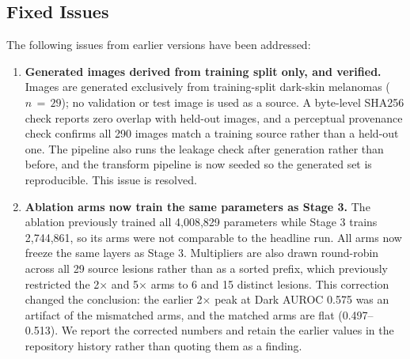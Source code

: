 \subsection{Fixed Issues}

The following issues from earlier versions have been addressed:

\begin{enumerate}
    \item \textbf{Generated images derived from training split only, and verified.} Images are generated exclusively from training-split dark-skin melanomas ($n\,{=}\,29$); no validation or test image is used as a source. A byte-level SHA256 check reports zero overlap with held-out images, and a perceptual provenance check confirms all 290 images match a training source rather than a held-out one. The pipeline also runs the leakage check after generation rather than before, and the transform pipeline is now seeded so the generated set is reproducible. This issue is resolved.

    \item \textbf{Ablation arms now train the same parameters as Stage 3.} The ablation previously trained all 4,008,829 parameters while Stage 3 trains 2,744,861, so its arms were not comparable to the headline run. All arms now freeze the same layers as Stage 3. Multipliers are also drawn round-robin across all 29 source lesions rather than as a sorted prefix, which previously restricted the 2$\times$ and 5$\times$ arms to 6 and 15 distinct lesions. This correction changed the conclusion: the earlier 2$\times$ peak at Dark AUROC 0.575 was an artifact of the mismatched arms, and the matched arms are flat (0.497--0.513). We report the corrected numbers and retain the earlier values in the repository history rather than quoting them as a finding.
\end{enumerate}
